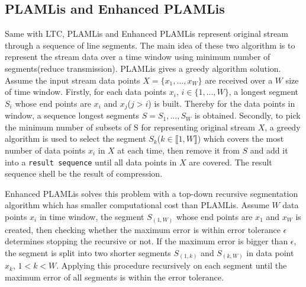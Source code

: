 \subsection{PLAMLis and Enhanced PLAMLis}
Same with LTC, PLAMLis and Enhanced PLAMLis represent original stream through a
sequence of line segments. The main idea of these two algorithm is to represent
the stream data over a time window using minimum number of segments(reduce
transmission). PLAMLis gives a greedy algorithm solution. Assume the input
stream data points $X=\{x_1, ..., x_W\}$ are received over a $W$ size of time
window. Firstly, for each data points $x_i$, $i \in \{1, ..., W\}$, a longest
segment $S_{i}$ whose end points are $x_i$ and $x_j$($j>i$) is built. Thereby
for the data points in window, a sequence longest segments $S = {S_1, ..., S_W}$
is obtained. Secondly, to pick the minimum number of subsets of S for
representing original stream $X$, a greedy algorithm is used to select the
segment $S_k$($k \in \llbracket1, W\rrbracket$) which covers the most number of
data points $x_i$ in $X$ at each time, then remove it from $S$ and add it into a
\texttt{result sequence} until all data points in $X$ are covered. The result
sequence shell be the result of compression.

Enhanced PLAMLis solves this problem with a top-down recursive segmentation
algorithm which has smaller computational cost than PLAMLis. Assume $W$ data
points $x_i$ in time window, the segment $S_{(1, W)}$ whose end points are $x_1$
and $x_W$ is created, then checking whether the maximum error is within error
tolerance $\epsilon$ determines stopping the recursive or not. If the maximum
error is bigger than $\epsilon$, the segment is split into two shorter segments
$S_{(1, k)}$ and $S_{(k, W)}$ in data point $x_k$, $1<k<W$. Applying this
procedure recursively on each segment until the maximum error of all segments is
within the error tolerance.

